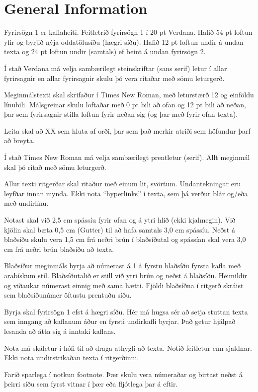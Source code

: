 \documentclass[a4paper,12pt,twoside,BCOR=10mm]{scrbook}
\begin{document}
\chapter{General Information}
\setcounter{page}{1}
Fyrirsögn 1 er kaflaheiti. Feitletrið fyrirsögn 1 í 20 pt Verdana. Hafið 54 pt loftun yfir og byrjið nýja oddatölusíðu (hægri síðu). Hafið 12 pt loftun undir á undan texta og 24 pt loftun undir (samtals) ef beint á undan fyrirsögn 2.

Í stað Verdana má velja sambærilegt steinskriftar (sans serif) letur í allar fyrirsagnir en allar fyrirsagnir skulu þó vera ritaðar með sömu leturgerð.

Meginmálstexti skal skrifaður í Times New Roman, með leturstærð 12 og einföldu línubili. Málsgreinar skulu loftaðar með 0 pt bili að ofan og 12 pt bili að neðan, þar sem fyrirsagnir stilla loftun fyrir neðan sig (og þar með fyrir ofan texta).

Leita skal að XX sem hluta af orði, þar sem það merkir atriði sem höfundur þarf að breyta.

Í stað Times New Roman má velja sambærilegt prentletur (serif). Allt meginmál skal þó ritað með sömu leturgerð. 

Allur texti ritgerðar skal ritaður með einum lit, svörtum. Undantekningar eru leyfðar innan mynda. Ekki nota “hyperlinks” í texta, sem þá verður blár og/eða með undirlínu.

Notast skal við 2,5 cm spássíu fyrir ofan og á ytri hlið (ekki kjalmegin). Við kjölin skal bæta 0,5 cm (Gutter) til að hafa samtals 3,0 cm spássíu. Neðst á blaðsíðu skulu vera 1,5 cm frá neðri brún í blaðsíðutal og spássían skal vera 3,0 cm frá neðri brún blaðsíðu að texta.

Blaðsíður meginmáls byrja að númerast á 1 á fyrstu blaðsíðu fyrsta kafla með arabískum stíl. Blaðsíðutalið er still við ytri brún og neðst á blaðsíðu. Heimildir og viðaukar númerast einnig með sama hætti. Fjöldi blaðsíðna í ritgerð skráist sem blaðsíðunúmer öftustu prentuðu síðu.

Byrja skal fyrirsögn 1 efst á hægri síðu. Hér má hugsa sér að setja stuttan texta sem inngang að kaflanum áður en fyrsti undirkafli byrjar. Það getur hjálpað lesanda að átta sig á inntaki kaflans.

Nota má skáletur í hófi til að draga athygli að texta. Notið feitletur enn sjaldnar. Ekki nota undirstrikaðan texta í ritgerðinni.

Farið sparlega í notkun footnote. Þær skulu vera númeraðar og birtast neðst á þeirri síðu sem fyrst vitnar í þær eða fljótlega þar á eftir.
\end{document}
